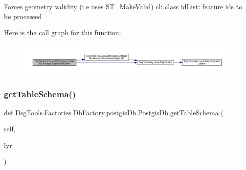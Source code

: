 \begin{DoxyVerb}Forces geometry validity (i.e uses ST_MakeValid)
cl: class
idList: feature ids to be processed
\end{DoxyVerb}
 Here is the call graph for this function\+:
\nopagebreak
\begin{figure}[H]
\begin{center}
\leavevmode
\includegraphics[width=350pt]{class_dsg_tools_1_1_factories_1_1_db_factory_1_1postgis_db_1_1_postgis_db_a060cff436f63056b1f4ef9ce59caf5bd_cgraph}
\end{center}
\end{figure}
\mbox{\label{class_dsg_tools_1_1_factories_1_1_db_factory_1_1postgis_db_1_1_postgis_db_a6fda820eb975b10f79452e95fe3225cc}} 
\subsubsection{\texorpdfstring{get\+Table\+Schema()}{getTableSchema()}}
{\footnotesize\ttfamily def Dsg\+Tools.\+Factories.\+Db\+Factory.\+postgis\+Db.\+Postgis\+Db.\+get\+Table\+Schema (\begin{DoxyParamCaption}\item[{}]{self,  }\item[{}]{lyr }\end{DoxyParamCaption})}

